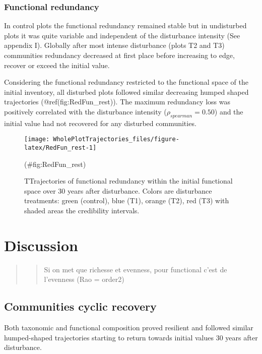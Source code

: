\documentclass[fleqn,10pt]{ArtEcoFoG} %
\theoremstyle{definition}
\theoremstyle{definition}
\theoremstyle{definition}
\theoremstyle{remark}
\begin{document}
\subsubsection{Functional redundancy}\label{functional-redundancy}

In control plots the functional redundancy remained stable but in
undisturbed plots it was quite variable and independent of the
disturbance intensity (See appendix I). Globally after most intense
disturbance (plots T2 and T3) communities redundancy decreased at first
place before increasing to edge, recover or exceed the initial value.

Considering the functional redundancy restricted to the functional space
of the initial inventory, all disturbed plots followed similar
decreasing humped shaped trajectories (@ref(fig:RedFun\_rest)). The
maximum redundancy loss was positively correlated with the disturbance
intensity (\(\rho_{spearman}=0.50\)) and the initial value had not
recovered for any disturbed communities.

\begin{figure}

{\centering \texttt{[image: WholePlotTrajectories\_files/figure-latex/RedFun\_rest-1]} 

}

\caption{TTrajectories of functional redundancy within the initial functional space over 30 years after disturbance. Colors are disturbance treatments: green (control), blue (T1), orange (T2), red (T3) with shaded areas the credibility intervals.}(\#fig:RedFun_rest)
\end{figure}

\section{Discussion}\label{discussion}

\begin{quote}
\begin{quote}
Si on met que richesse et evenness, pour functional c'est de l'evenness
(Rao = order2)
\end{quote}
\end{quote}

\subsection{Communities cyclic
recovery}\label{communities-cyclic-recovery}

Both taxonomic and functional composition proved resilient and followed
similar humped-shaped trajectories starting to return towards initial
values 30 years after disturbance.
\end{document}
